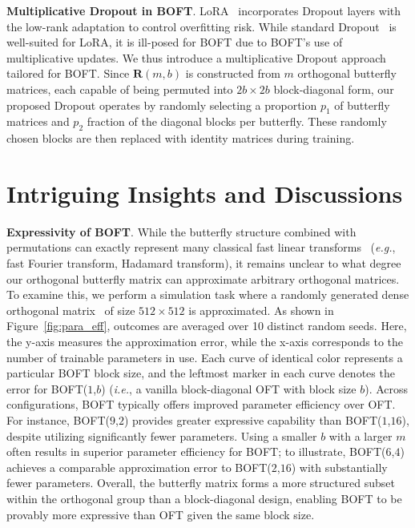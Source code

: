 \textbf{Multiplicative Dropout in BOFT}. LoRA~\cite{hulora2022} incorporates Dropout layers with the low-rank adaptation to control overfitting risk. While standard Dropout~\cite{srivastava2014dropout} is well-suited for LoRA, it is ill-posed for BOFT due to BOFT's use of multiplicative updates. We thus introduce a multiplicative Dropout approach tailored for BOFT. Since $\bm{R}(m,b)$ is constructed from $m$ orthogonal butterfly matrices, each capable of being permuted into $2b\times 2b$ block-diagonal form, our proposed Dropout operates by randomly selecting a proportion $p_1$ of butterfly matrices and $p_2$ fraction of the diagonal blocks per butterfly. These randomly chosen blocks are then replaced with identity matrices during training.

\section{Intriguing Insights and Discussions}

\textbf{Expressivity of BOFT}. While the butterfly structure combined with permutations can exactly represent many classical fast linear transforms~\cite{dao2019learning,dao2019kaleidoscope} (\emph{e.g.}, fast Fourier transform, Hadamard transform), it remains unclear to what degree our orthogonal butterfly matrix can approximate arbitrary orthogonal matrices. To examine this, we perform a simulation task where a randomly generated dense orthogonal matrix~\cite{anderson1987generation} of size $512\times 512$ is approximated. As shown in Figure~\ref{fig:para_eff}, outcomes are averaged over 10 distinct random seeds. Here, the y-axis measures the approximation error, while the x-axis corresponds to the number of trainable parameters in use. Each curve of identical color represents a particular BOFT block size, and the leftmost marker in each curve denotes the error for BOFT($1$,$b$) (\emph{i.e.}, a vanilla block-diagonal OFT with block size $b$). Across configurations, BOFT typically offers improved parameter efficiency over OFT. For instance, BOFT($9$,$2$) provides greater expressive capability than BOFT($1$,$16$), despite utilizing significantly fewer parameters. Using a smaller $b$ with a larger $m$ often results in superior parameter efficiency for BOFT; to illustrate, BOFT($6$,$4$) achieves a comparable approximation error to BOFT($2$,$16$) with substantially fewer parameters. Overall, the butterfly matrix forms a more structured subset within the orthogonal group than a block-diagonal design, enabling BOFT to be provably more expressive than OFT given the same block size.

